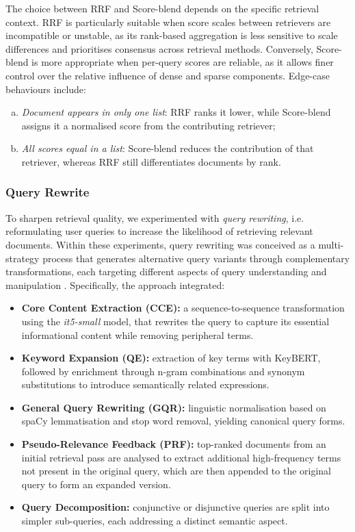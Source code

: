 \begin{spacing}{1.5}
\vspace{1em}

The choice between RRF and Score-blend depends on the specific retrieval context. RRF is particularly suitable when score scales between retrievers are incompatible or unstable, as its rank-based aggregation is less sensitive to scale differences and prioritises consensus across retrieval methods. Conversely, Score-blend is more appropriate when per-query scores are reliable, as it allows finer control over the relative influence of dense and sparse components. Edge-case behaviours include: 
\begin{enumerate}[(a)] 
\item \textit{Document appears in only one list}: RRF ranks it lower, while Score-blend assigns it a normalised score from the contributing retriever;
\item \textit{All scores equal in a list}: Score-blend reduces the contribution of that retriever, whereas RRF still differentiates documents by rank.
\end{enumerate}


\noindent \subsubsection*{\Large Query Rewrite}
To sharpen retrieval quality, we experimented with \textit{query rewriting}, i.e. reformulating user queries to increase the likelihood of retrieving relevant documents. Within these experiments, query rewriting was conceived as a multi-strategy process that generates alternative query variants through complementary transformations, each targeting different aspects of query understanding and manipulation \citep{li_dmqr-rag_2024}. Specifically, the approach integrated:
\begin{itemize}
      \item \textbf{Core Content Extraction (CCE):} a sequence-to-sequence transformation using the \textit{it5-small} model, that rewrites the query to capture its essential informational content while removing peripheral terms.
      \item \textbf{Keyword Expansion (QE):} extraction of key terms with KeyBERT, followed by enrichment through n-gram combinations and synonym substitutions to introduce semantically related expressions.
      \item \textbf{General Query Rewriting (GQR):} linguistic normalisation based on spaCy lemmatisation and stop word removal, yielding canonical query forms.
      \item \textbf{Pseudo-Relevance Feedback (PRF):} top-ranked documents from an initial retrieval pass are analysed to extract additional high-frequency terms not present in the original query, which are then appended to the original query to form an expanded version.
      \item \textbf{Query Decomposition:} conjunctive or disjunctive queries are split into simpler sub-queries, each addressing a distinct semantic aspect.
\end{itemize}


\end{spacing}
